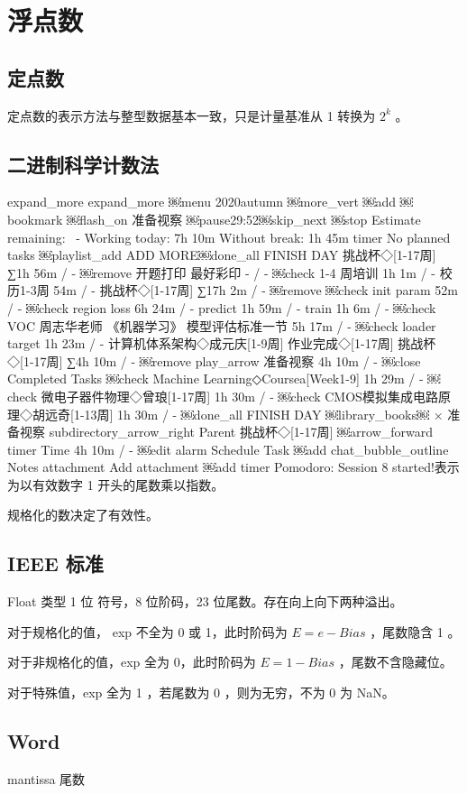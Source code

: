 \documentclass[cn,11pt,chinese,black,simple]{../elegantbook}
\begin{document}
\fi 
\def\chapname{03float}

\chapter{浮点数}

\section{定点数}

定点数的表示方法与整型数据基本一致，只是计量基准从 1 转换为 \(2^k\) 。

\section{二进制科学计数法}


expand_more
expand_more
￼menu
2020autumn
￼more_vert
￼add
￼bookmark
￼flash_on
准备视察
￼pause29:52￼skip_next
￼stop
Estimate remaining:~
-
Working today:
7h 10m
Without break: 
1h 45m
timer
No planned tasks
￼playlist_add ADD MORE￼done_all FINISH DAY
挑战杯◇[1-17周]
∑1h 56m
/
-
￼remove
开题打印 最好彩印
-
/
-
￼check
1-4 周培训
1h 1m
/
-
校历1-3周
54m
/
-
挑战杯◇[1-17周]
∑17h 2m
/
-
￼remove
￼check
init param
52m
/
-
￼check
region loss
6h 24m
/
-
predict
1h 59m
/
-
train
1h 6m
/
-
￼check
VOC 周志华老师 《机器学习》 模型评估标准一节
5h 17m
/
-
￼check
loader target
1h 23m
/
-
计算机体系架构◇成元庆[1-9周]
作业完成◇[1-17周]
挑战杯◇[1-17周]
∑4h 10m
/
-
￼remove
play_arrow
准备视察
4h 10m
/
-
￼close
Completed Tasks
￼check
Machine Learning◇Coursea[Week1-9]
1h 29m
/
-
￼check
微电子器件物理◇曾琅[1-17周]
1h 30m
/
-
￼check
CMOS模拟集成电路原理◇胡远奇[1-13周]
1h 30m
/
-
￼done_all FINISH DAY
￼library_books￼ ×
准备视察
subdirectory_arrow_right
Parent
挑战杯◇[1-17周]
￼arrow_forward
timer
Time
4h 10m
/
-
￼edit
alarm
Schedule Task
￼add
chat_bubble_outline
Notes
attachment
Add attachment
￼add
timer
Pomodoro: Session 8 started!表示为以有效数字 1 开头的尾数乘以指数。

规格化的数决定了有效性。

\section{IEEE 标准}

Float 类型 1 位 符号，8 位阶码，23 位尾数。存在向上向下两种溢出。

对于规格化的值， exp 不全为 0 或 1，此时阶码为 \(E = e - Bias\) ，尾数隐含 1 。

对于非规格化的值，exp 全为 0，此时阶码为 \(E = 1 - Bias\) ，尾数不含隐藏位。

对于特殊值，exp 全为 1 ，若尾数为 0 ，则为无穷，不为 0 为 NaN。

\section*{Word}

mantissa 尾数


\let\chapname\undefined
\ifx\mainclass\undefined
\end{document}
